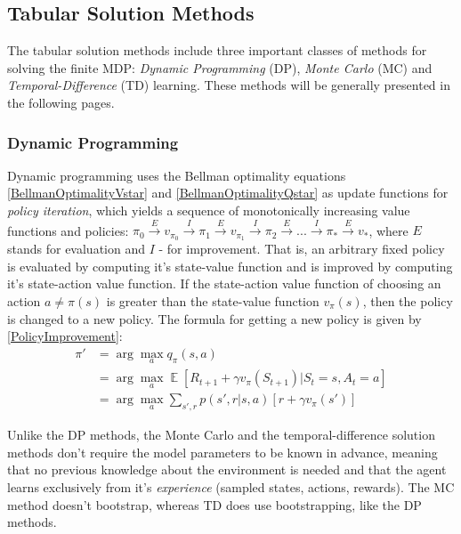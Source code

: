 \subsection{Tabular Solution Methods}
The tabular solution methods include three important classes of methods for solving the finite MDP: \textit{Dynamic Programming} (DP), \textit{Monte Carlo} (MC) and \textit{Temporal-Difference} (TD) learning. These methods will be generally presented in the following pages.

\subsubsection{Dynamic Programming}
Dynamic programming uses the Bellman optimality equations \ref{BellmanOptimalityVstar} and \ref{BellmanOptimalityQstar} as update functions for \textit{policy iteration}, which yields a sequence of monotonically increasing value functions and policies: ${\pi}_{0}\overset{E}{\rightarrow}v_{{\pi}_{0}}\overset{I}{\rightarrow}{\pi}_{1}\overset{E}{\rightarrow}v_{{\pi}_{1}}\overset{I}{\rightarrow}{\pi}_{2}\overset{E}{\rightarrow}...\overset{I}{\rightarrow}{\pi}_{*}\overset{E}{\rightarrow}v_{*}$, where $E$ stands for evaluation and $I$ - for improvement. That is, an arbitrary fixed policy is evaluated by computing it's state-value function and is improved by computing it's state-action value function. If the state-action value function of choosing an action $a \neq \pi(s)$ is greater than the state-value function $v_{\pi}(s)$, then the policy is changed to a new policy. The formula for getting a new policy is given by \ref{PolicyImprovement}:
\begin{equation}\label{PolicyImprovement}
\begin{split}
\pi'&=\arg\!\max_{a}q_{\pi}(s,a)\\
&=\arg\!\max_{a}\mathop{{}\mathbb{E}}\left [ R_{t+1} + \gamma v_{\pi}(S_{t+1})|S_{t}=s, A_{t}=a  \right ] \\
&=\arg\!\max_{a}\sum_{s',r}p(s',r|s,a)\left [ r+\gamma v_{\pi}(s') \right ]
\end{split}
\end{equation}

Unlike the DP methods, the Monte Carlo and the temporal-difference solution methods don't require the model parameters to be known in advance, meaning that no previous knowledge about the environment is needed and that the agent learns exclusively from it's \textit{experience} (sampled states, actions, rewards). The MC method doesn't bootstrap, whereas TD does use bootstrapping, like the DP methods.

